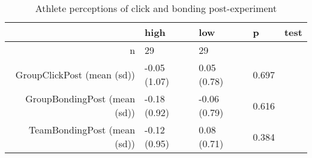 \begin{table}[ht]
\centering
\begin{tabular}{rllll}
  \hline
 & high & low & p & test \\ 
  \hline
n &    29 &    29 &  &  \\ 
  GroupClickPost (mean (sd)) & -0.05 (1.07) &  0.05 (0.78) &  0.697 &  \\ 
  GroupBondingPost (mean (sd)) & -0.18 (0.92) & -0.06 (0.79) &  0.616 &  \\ 
  TeamBondingPost (mean (sd)) & -0.12 (0.95) &  0.08 (0.71) &  0.384 &  \\ 
   \hline
\end{tabular}
\caption{Athlete perceptions of click and bonding 
 post-experiment} 
\label{tab:clickBondConditionPost}
\end{table}
